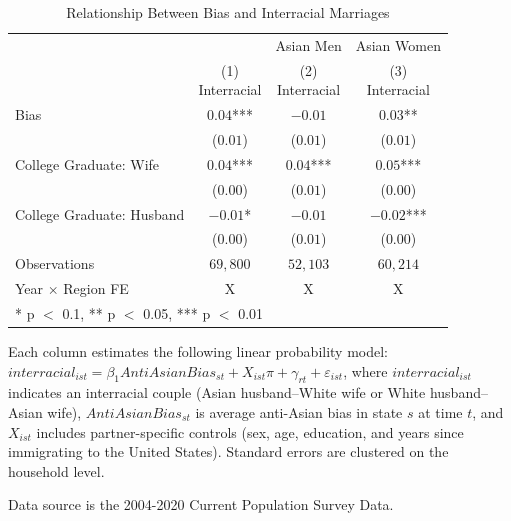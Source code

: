 \begin{table}[H]
\centering\centering
\caption{Relationship Between Bias and Interracial Marriages \label{regtab-logit-02}}
\centering
\begin{threeparttable}
\begin{tabular}[t]{lccc}
\toprule
\multicolumn{2}{c}{ } & \multicolumn{1}{c}{Asian Men} & \multicolumn{1}{c}{Asian Women} \\
\cmidrule(l{3pt}r{3pt}){3-3} \cmidrule(l{3pt}r{3pt}){4-4}
  & \specialcell{(1) \\ Interracial} & \specialcell{(2) \\ Interracial} & \specialcell{(3) \\ Interracial}\\
\midrule
Bias & $0.04$*** & $-0.01$ & $0.03$**\\
 & ($0.01$) & ($0.01$) & ($0.01$)\\
College Graduate: Wife & $0.04$*** & $0.04$*** & $0.05$***\\
 & ($0.00$) & ($0.01$) & \vphantom{1} ($0.00$)\\
College Graduate: Husband & $-0.01$* & $-0.01$ & $-0.02$***\\
 & ($0.00$) & ($0.01$) & ($0.00$)\\
\midrule
Observations & $69,800$ & $52,103$ & $60,214$\\
Year $\times$ Region FE & X & X & X\\
\bottomrule
\multicolumn{4}{l}{\rule{0pt}{1em}* p $<$ 0.1, ** p $<$ 0.05, *** p $<$ 0.01}\\
\end{tabular}
\begin{tablenotes}
\small
\item[1] \footnotesize{Each column estimates the following linear probability model: $interracial_{ist} = \beta_1 AntiAsianBias_{st} + X_{ist}\pi + \gamma_{rt} + \varepsilon_{ist}$, where $interracial_{ist}$ indicates an interracial couple (Asian husband--White wife or White husband--Asian wife), $AntiAsianBias_{st}$ is average anti-Asian bias in state $s$ at time $t$, and $X_{ist}$ includes partner-specific controls (sex, age, education, and years since immigrating to the United States). Standard errors are clustered on the household level.}
\item[3] \footnotesize{Data source is the 2004-2020 Current Population Survey Data.}
\end{tablenotes}
\end{threeparttable}
\end{table}
